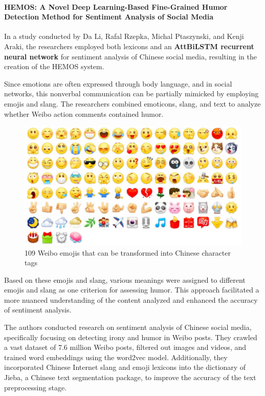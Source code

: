 \documentclass[a4paper]{article}
\begin{document}
\paragraph{HEMOS: A Novel Deep Learning-Based Fine-Grained Humor Detection Method for Sentiment Analysis of Social Media}

In a study conducted by Da Li, Rafal Rzepka, Michal Ptaszynski, and Kenji Araki, the researchers employed both lexicons and an \textbf{AttBiLSTM recurrent neural network} for sentiment analysis of Chinese social media, resulting in the creation of the HEMOS system.

Since emotions are often expressed through body language, and in social networks, this nonverbal communication can be partially mimicked by employing emojis and slang. The researchers combined emoticons, slang, and text to analyze whether Weibo action comments contained humor.

\begin{figure}[H]
\centering
\includegraphics[width=1\textwidth]{./images/108_Weibo_emojis.png}
\caption{109 Weibo emojis that can be transformed into Chinese character tags}
\label{fig.109 Weibo emojis that can be transformed into Chinese character tags.[HEMOS: A Novel Deep Learning-Based Fine-Grained Humor Detection Method for Sentiment Analysis of Social Media]}
\end{figure}

Based on these emojis and slang, various meanings were assigned to different emojis and slang as one criterion for assessing humor. This approach facilitated a more nuanced understanding of the content analyzed and enhanced the accuracy of sentiment analysis.

The authors conducted research on sentiment analysis of Chinese social media, specifically focusing on detecting irony and humor in Weibo posts. They crawled a vast dataset of 7.6 million Weibo posts, filtered out images and videos, and trained word embeddings using the word2vec model. Additionally, they incorporated Chinese Internet slang and emoji lexicons into the dictionary of Jieba, a Chinese text segmentation package, to improve the accuracy of the text preprocessing stage.
\end{document}
